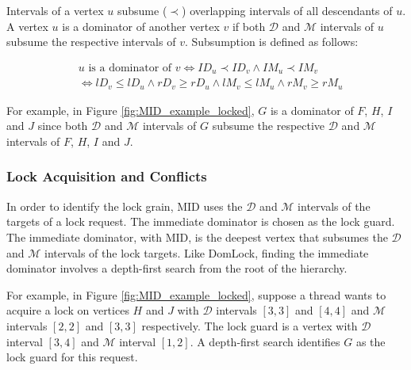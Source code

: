 Intervals of a vertex $u$ subsume ($\prec$) overlapping intervals of all descendants of $u$. A vertex $u$ is a dominator of another vertex $v$ if both $\mathcal{D}$ and $\mathcal{M}$ intervals of $u$ subsume the respective intervals of $v$.
Subsumption is defined as follows:

\begin{equation}
    \begin{split}
        & u \text{ is a dominator of } v \iff ID_u \prec ID_v \land IM_u \prec IM_v
        \\ & \iff \mathit{lD}_v \leq \mathit{lD}_u \land \mathit{rD}_v \geq \mathit{rD}_u \land \mathit{lM}_v \leq \mathit{lM}_u \land \mathit{rM}_v \geq \mathit{rM}_u
    \end{split}
\end{equation}

For example, in Figure \ref{fig:MID_example_locked}, $G$ is a dominator of $F$, $H$, $I$ and $J$ since both $\mathcal{D}$ and $\mathcal{M}$ intervals of $G$ subsume the respective $\mathcal{D}$ and $\mathcal{M}$ intervals of $F$, $H$, $I$ and $J$.

\subsubsection{Lock Acquisition and Conflicts}
In order to identify the lock grain, MID uses the $\mathcal{D}$ and $\mathcal{M}$ intervals of the targets of a lock request. The immediate dominator is chosen as the lock guard. The immediate dominator, with MID, is the deepest vertex that subsumes the $\mathcal{D}$ and $\mathcal{M}$ intervals of the lock targets. Like DomLock, finding the immediate dominator involves a depth-first search from the root of the hierarchy.

For example, in Figure \ref{fig:MID_example_locked}, suppose a thread wants to acquire a lock on vertices $H$ and $J$ with $\mathcal{D}$ intervals $[3,3]$ and $[4,4]$ and $\mathcal{M}$ intervals $[2,2]$ and $[3,3]$ respectively. The lock guard is a vertex with $\mathcal{D}$ interval $[3,4]$ and $\mathcal{M}$ interval $[1,2]$. A depth-first search identifies $G$ as the lock guard for this request. 


